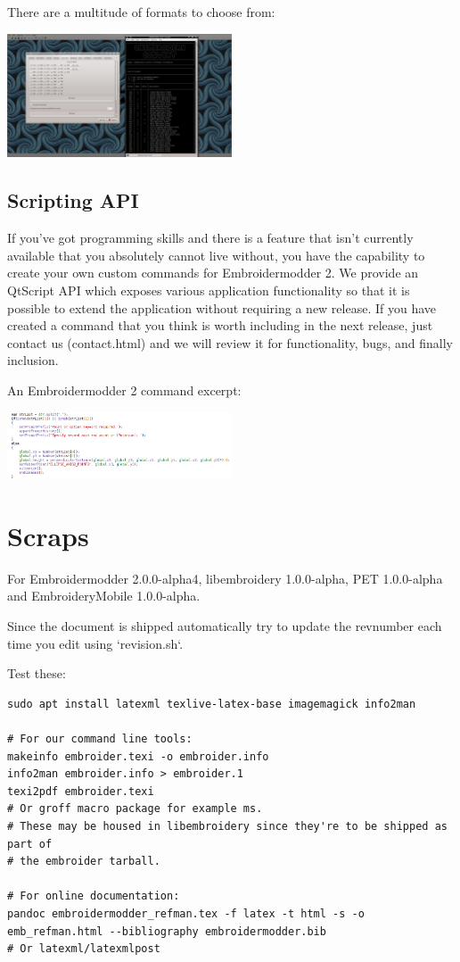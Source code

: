 \documentclass[11pt]{report}
\begin{document}
There are a multitude of formats to choose from:

\includegraphics[width=0.5\textwidth]{images/features-formats-1.png}

\subsection{Scripting API}

If you've got programming skills and there is a feature that isn't currently available that you
absolutely cannot live without, you have the capability to create your own custom commands for
Embroidermodder 2. We provide an QtScript API which exposes various application functionality
so that it is possible to extend the application without requiring a new release. If you have
created a command that you think is worth including in the next release, just  contact
us (contact.html) and we will review it for functionality, bugs, and finally inclusion.

An Embroidermodder 2 command excerpt:

\includegraphics[width=0.5\textwidth]{images/features-scripting-1.png}


\section{Scraps}

For
Embroidermodder 2.0.0-alpha4, libembroidery 1.0.0-alpha, PET 1.0.0-alpha
and EmbroideryMobile 1.0.0-alpha.

Since the document is shipped automatically try to update the revnumber each
time you edit using `revision.sh`.

Test these:

\begin{lstlisting}
sudo apt install latexml texlive-latex-base imagemagick info2man

# For our command line tools:
makeinfo embroider.texi -o embroider.info
info2man embroider.info > embroider.1
texi2pdf embroider.texi
# Or groff macro package for example ms.
# These may be housed in libembroidery since they're to be shipped as part of
# the embroider tarball.

# For online documentation:
pandoc embroidermodder_refman.tex -f latex -t html -s -o emb_refman.html --bibliography embroidermodder.bib
# Or latexml/latexmlpost
\end{lstlisting}
\end{document}
